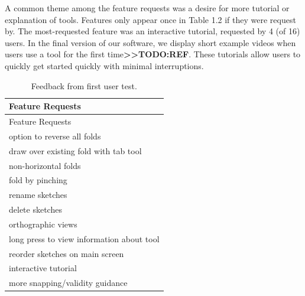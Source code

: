 A common theme among the feature requests was a desire for more tutorial
or explanation of tools. Features only appear once in Table 1.2 if they
were request by. The most-requested feature was an interactive tutorial,
requested by 4 (of 16) users. In the final version of our software, we
display short example videos when users use a tool for the first
time\textbf{\textgreater{}\textgreater{}TODO:REF}. These tutorials allow
users to quickly get started quickly with minimal interruptions.

\begin{longtable}[c]{@{}l@{}}
\caption{Feedback from first user test.}\tabularnewline
\toprule
\begin{minipage}[b]{0.82\columnwidth}\raggedright\strut
Feature Requests
\strut\end{minipage}\tabularnewline
\midrule
\endfirsthead
\toprule
\begin{minipage}[b]{0.82\columnwidth}\raggedright\strut
Feature Requests
\strut\end{minipage}\tabularnewline
\midrule
\endhead
\begin{minipage}[t]{0.82\columnwidth}\raggedright\strut
option to reverse all folds
\strut\end{minipage}\tabularnewline
\begin{minipage}[t]{0.82\columnwidth}\raggedright\strut
draw over existing fold with tab tool
\strut\end{minipage}\tabularnewline
\begin{minipage}[t]{0.82\columnwidth}\raggedright\strut
non-horizontal folds
\strut\end{minipage}\tabularnewline
\begin{minipage}[t]{0.82\columnwidth}\raggedright\strut
fold by pinching
\strut\end{minipage}\tabularnewline
\begin{minipage}[t]{0.82\columnwidth}\raggedright\strut
rename sketches
\strut\end{minipage}\tabularnewline
\begin{minipage}[t]{0.82\columnwidth}\raggedright\strut
delete sketches
\strut\end{minipage}\tabularnewline
\begin{minipage}[t]{0.82\columnwidth}\raggedright\strut
orthographic views
\strut\end{minipage}\tabularnewline
\begin{minipage}[t]{0.82\columnwidth}\raggedright\strut
long press to view information about tool
\strut\end{minipage}\tabularnewline
\begin{minipage}[t]{0.82\columnwidth}\raggedright\strut
reorder sketches on main screen
\strut\end{minipage}\tabularnewline
\begin{minipage}[t]{0.82\columnwidth}\raggedright\strut
interactive tutorial
\strut\end{minipage}\tabularnewline
\begin{minipage}[t]{0.82\columnwidth}\raggedright\strut
more snapping/validity guidance
\strut\end{minipage}\tabularnewline
\bottomrule
\end{longtable}
